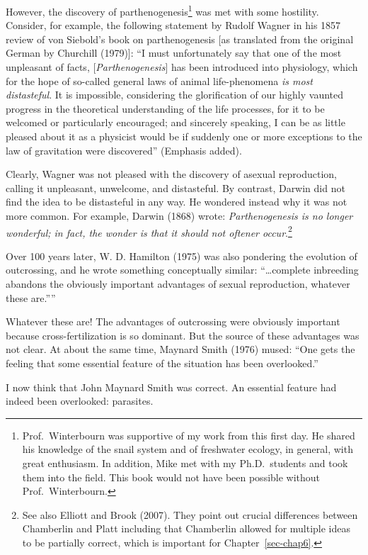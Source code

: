 \documentclass[
  letterpaper,
]{book}
\begin{document}
However, the discovery of parthenogenesis\footnote{Prof.~Winterbourn was
  supportive of my work from this first day. He shared his knowledge of
  the snail system and of freshwater ecology, in general, with great
  enthusiasm. In addition, Mike met with my Ph.D.~students and took them
  into the field. This book would not have been possible without
  Prof.~Winterbourn.} was met with some hostility. Consider, for
example, the following statement by Rudolf Wagner in his 1857 review of
von Siebold's book on parthenogenesis {[}as translated from the original
German by Churchill (1979){]}: ``I must unfortunately say that one of
the most unpleasant of facts, {[}\emph{Parthenogenesis}{]} has been
introduced into physiology, which for the hope of so-called general laws
of animal life-phenomena \emph{is most distasteful}. It is impossible,
considering the glorification of our highly vaunted progress in the
theoretical understanding of the life processes, for it to be welcomed
or particularly encouraged; and sincerely speaking, I can be as little
pleased about it as a physicist would be if suddenly one or more
exceptions to the law of gravitation were discovered'' (Emphasis added).

Clearly, Wagner was not pleased with the discovery of asexual
reproduction, calling it unpleasant, unwelcome, and distasteful. By
contrast, Darwin did not find the idea to be distasteful in any way. He
wondered instead why it was not more common. For example, Darwin (1868)
wrote: \emph{Parthenogenesis is no longer wonderful; in fact, the wonder
is that it should not oftener occur}.\footnote{See also Elliott and
  Brook (2007). They point out crucial differences between Chamberlin
  and Platt including that Chamberlin allowed for multiple ideas to be
  partially correct, which is important for Chapter~\ref{sec-chap6}.}

Over 100 years later, W. D. Hamilton (1975) was also pondering the
evolution of outcrossing, and he wrote something conceptually similar:
``\ldots complete inbreeding abandons the obviously important advantages
of sexual reproduction, whatever these are.''''

Whatever these are! The advantages of outcrossing were obviously
important because cross-fertilization is so dominant. But the source of
these advantages was not clear. At about the same time, Maynard Smith
(1976) mused: ``One gets the feeling that some essential feature of the
situation has been overlooked.''

I now think that John Maynard Smith was correct. An essential feature
had indeed been overlooked: parasites.
\end{document}
